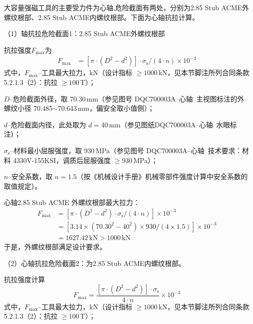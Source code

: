 大容量强磁工具的主要受力件为心轴,危险截面有两处，分别为2.85 Stub ACME外螺纹根部、2.85 Stub ACME内螺纹根部。下面为心轴抗拉计算。

（1）轴抗拉危险截面1：2.85 Stub ACME外螺纹根部

抗拉强度$F_{\max}$为
\begin{equation}
    \begin{aligned}
        F_{\max} &= \left[\pi \cdot (D^2 - d^2)\right] \cdot \sigma_{\mathrm{s}} / (4 \cdot n) \times 10^{-3}
    \end{aligned}
\end{equation}
式中，$F_{\max}$--工具最大拉力，kN（设计指标 $\ge 1000$\,kN，见本节脚注所列合同条款 5.2.1.3（2）：抗拉 $\ge 100$\,T）；

$D$--危险截面外径，取 70.30\,mm（参见图号 DQC700003A--心轴\ 主视图标注的外螺纹小径 70.485$\sim$70.643\,mm，偏安全取小值侧）；

$d$--危险截面内径，此处取为 $d = 40\,\text{mm}$（参见图纸DQC700003A--心轴\ 水眼标注）；

$\sigma_\mathrm{s}$--材料最小屈服强度，取 930\,MPa（参见图号 DQC700003A--心轴\ 技术要求：材料 4330V-155KSI，调质后屈服强度 $\ge 930$\,MPa）；

$n$--安全系数，取 $n = 1.5$（按《机械设计手册》机械零部件强度计算中安全系数的取值规定\cite{ref26}）。

心轴2.85 Stub ACME 外螺纹根部最大拉力：
\begin{equation}
    \begin{aligned}
            F_{\max} &= \left[\pi \cdot (D^2 - d^2) \cdot \sigma_{\mathrm{s}} / (4 \cdot n)\right] \times 10^{-3} \\
                    &= \left[3.14 \times (70.30^2 - 40^2) \times 930 / (4 \times 1.5)\right] \times 10^{-3} \\
                    &= 1627.42 \, \text{kN} > 1000 \, \text{kN}
        \end{aligned}
\end{equation}
于是，外螺纹根部满足设计要求。

（2）心轴抗拉危险截面2：为2.85 Stub ACME内螺纹根部。

抗拉强度计算
\begin{equation}
    F_{\max} = \frac{[\pi \cdot (D^2 - d^2)] \cdot \sigma_{\mathrm{s}}}{4 \cdot n} \times 10^{-3}
\end{equation}
式中，$F_{\max}$--工具最大拉力，kN（设计指标 $\ge 1000$\,kN，见本节脚注所列合同条款 5.2.1.3（2）：抗拉 $\ge 100$\,T）；

